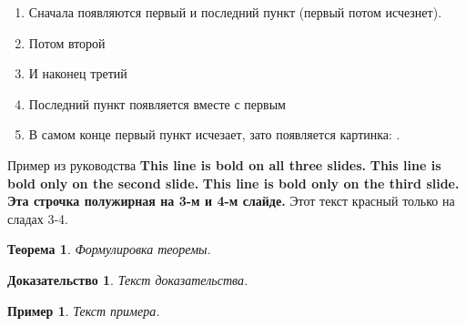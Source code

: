 \documentclass[t,pdf,hyperref={unicode}]{beamer} %
\newtheorem{rtheorem}{Теорема}
\newtheorem{rproof}{Доказательство}
\newtheorem{rexample}{Пример}
\begin{document}
\begin{frame}
  \begin{enumerate}
    \item<1-5> Сначала появляются первый и последний пункт (первый потом исчезнет).
    \item<2-> Потом второй
    \item<3-> И наконец третий
    \item<1-> Последний пункт появляется вместе с первым
    \item<6-> В самом конце первый пункт исчезает, зато появляется картинка: \insertlogo.
  \end{enumerate}
\end{frame}

\begin{frame}{Пример из руководства}
  \textbf{This line is bold on all three slides.}
  \textbf<2>{This line is bold only on the second slide.}
  \textbf<3>{This line is bold only on the third slide.}
  \textbf<3,4>{Эта строчка полужирная на 3-м и 4-м слайде.}
	 Этот текст красный только на сладах 3-4.
\end{frame}

\begin{frame}
  \begin{rtheorem}
    Формулировка теоремы.    
  \end{rtheorem}
	\begin{rproof}
		Текст доказательства.
  \end{rproof}
	\begin{rexample}
		Текст примера.
	\end{rexample}
\end{frame}
\end{document}
